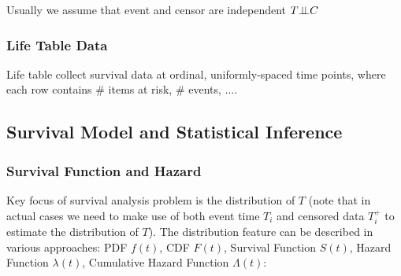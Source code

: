 Usually we assume that event and censor are independent $ T\bot\!\!\!\bot C $

\subsubsection{Life Table Data}
Life table collect survival data at ordinal, uniformly-spaced time points, where each row contains \# items at risk, \# events, $ \ldots  $.


\subsection{Survival Model and Statistical Inference}
\subsubsection{Survival Function and Hazard}
Key focus of survival analysis problem is the distribution of $ T $ (note that in actual cases we need to make use of both event time $ T_i $ and censored data $ T^+_i $ to estimate the distribution of $ T $). The distribution feature can be described in various approaches: PDF $ f(t) $, CDF $ F(t) $, Survival Function $ S(t) $, Hazard Function $ \lambda (t) $, Cumulative Hazard Function $ \Lambda (t) $:
